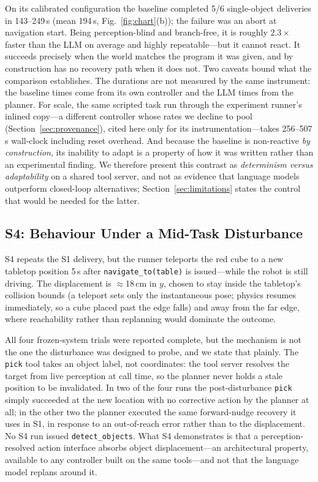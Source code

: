 \documentclass[conference]{IEEEtran}
\begin{document}
On its calibrated configuration the baseline completed 5/6 single-object
deliveries in 143--249\,s (mean 194\,s, Fig.~\ref{fig:chart}(b)); the
failure was an abort at navigation start. Being perception-blind and branch-free, it is roughly
$2.3\times$ faster than the LLM on average and highly repeatable---but it
cannot react. It succeeds precisely when the world matches the program it
was given, and by construction has no recovery path when it does not. Two
caveats bound what the comparison establishes. The durations are not
measured by the same instrument: the baseline times come from its own
controller and the LLM times from the planner. For scale, the same scripted
task run through the experiment runner's inlined copy---a different
controller whose rates we decline to pool
(Section~\ref{sec:provenance}), cited here only for its
instrumentation---takes 256--507\,s wall-clock including reset overhead. And because the baseline is non-reactive \emph{by construction},
its inability to adapt is a property of how it was written rather than an
experimental finding. We therefore present this contrast as
\emph{determinism versus adaptability} on a shared tool server, and
not as evidence that language models outperform closed-loop alternatives;
Section~\ref{sec:limitations} states the control that would be needed for
the latter.

\subsection{S4: Behaviour Under a Mid-Task Disturbance}
\label{sec:s4}

S4 repeats the S1 delivery, but the runner teleports the red cube to a new
tabletop position 5\,s after \texttt{navigate\_to(table)} is issued---while
the robot is still driving. The displacement is $\approx$18\,cm in $y$,
chosen to stay inside the tabletop's collision bounds (a teleport sets only
the instantaneous pose; physics resumes immediately, so a cube placed past
the edge falls) and away from the far edge, where reachability rather than
replanning would dominate the outcome.

All four frozen-system trials were reported complete, but the mechanism is
not the one the disturbance was designed to probe, and we state that
plainly. The \texttt{pick} tool takes an object label, not coordinates: the
tool server resolves the target from live perception at call time, so the
planner never holds a stale position to be invalidated. In two of the four
runs the post-disturbance \texttt{pick} simply succeeded at the new
location with no corrective action by the planner at all; in the other two
the planner executed the same forward-nudge recovery it uses in S1, in
response to an out-of-reach error rather than to the displacement. No S4
run issued \texttt{detect\_objects}. What S4 demonstrates is that a
perception-resolved action interface absorbs object displacement---an
architectural property, available to any controller built on the same
tools---and not that the language model replans around it.
\end{document}
